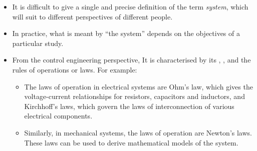 \documentclass[../notes-main.tex]{subfiles}
\begin{document}
\begin{center}
    \begin{itemize}
        \item It is difficult to give a single and precise definition of the term \emph{system}, which will suit to different perspectives of different people. \\
        \item In practice, what is meant by ``the system'' depends on the objectives of a particular study.\\
        \item From the control engineering perspective,  It is characterised by its , , and the rules of operations or laws. For example:
              \begin{itemize}
                  \item[\bluetext{a.}] The laws of operation in electrical systems are Ohm's law, which gives the voltage-current relationships for resistors, capacitors and inductors, and Kirchhoff's laws, which govern the laws of interconnection of various electrical components.
                  \item[\bluetext{b.}] Similarly, in mechanical systems, the laws of operation are Newton's laws. These laws can be used to derive mathematical models of the system.
              \end{itemize}
    \end{itemize}
\end{center}
\newpage
\end{document}
